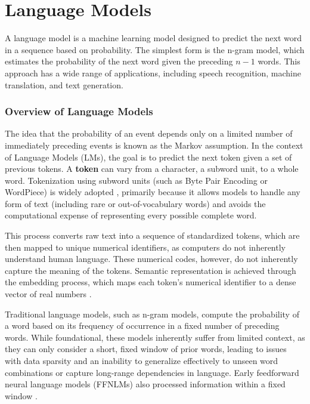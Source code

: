 \section{Language Models}
    A language model is a machine learning model designed to predict the next word in a sequence based on probability. The simplest form is the n-gram model, which estimates the probability of the next word given the preceding $n-1$ words. This approach has a wide range of applications, including speech recognition, machine translation, and text generation.
        
    \subsubsection{Overview of Language Models}
    
    The idea that the probability of an event depends only on a limited number of immediately preceding events is known as the Markov assumption. In the context of Language Models (LMs), the goal is to predict the next token given a set of previous tokens. A \textbf{token} can vary from a character, a subword unit, to a whole word. Tokenization using subword units (such as Byte Pair Encoding or WordPiece) is widely adopted \cite{jm3_llm_book}, primarily because it allows models to handle any form of text (including rare or out-of-vocabulary words) and avoids the computational expense of representing every possible complete word. 
    
    This process converts raw text into a sequence of standardized tokens, which are then mapped to unique numerical identifiers, as computers do not inherently understand human language. These numerical codes, however, do not inherently capture the meaning of the tokens. Semantic representation is achieved through the embedding process, which maps each token's numerical identifier to a dense vector of real numbers \cite{jm3_llm_book}.

    Traditional language models, such as n-gram models, compute the probability of a word based on its frequency of occurrence in a fixed number of preceding words. While foundational, these models inherently suffer from limited context, as they can only consider a short, fixed window of prior words, leading to issues with data sparsity and an inability to generalize effectively to unseen word combinations or capture long-range dependencies in language. Early feedforward neural language models (FFNLMs) also processed information within a fixed window \cite{jm3_llm_book}.
    
